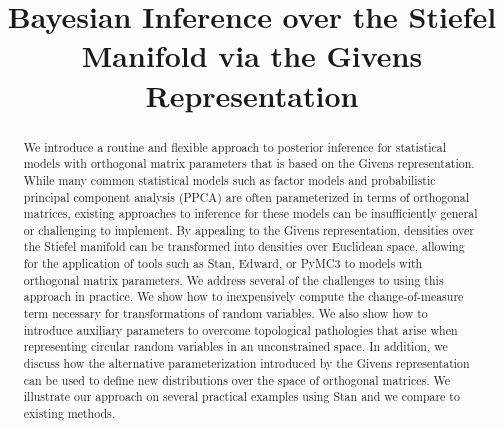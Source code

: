 \documentclass[ba]{imsart}
\numberwithin{equation}{section}
\theoremstyle{plain}
\begin{document}
\begin{frontmatter}
\title{Bayesian Inference over the Stiefel Manifold via the Givens Representation}


\begin{abstract}
We introduce a routine and flexible approach to posterior inference for statistical models with orthogonal matrix parameters that is based on the Givens representation. While many common statistical models such as factor models and probabilistic principal component analysis (PPCA) are often parameterized in terms of orthogonal matrices, existing approaches to inference for these models can be insufficiently general or challenging to implement. By appealing to the Givens representation, densities over the Stiefel manifold can be transformed into densities over Euclidean space, allowing for the application of tools such as Stan, Edward, or PyMC3 to models with orthogonal matrix parameters. We address several of the challenges to using this approach in practice. We show how to inexpensively compute the change-of-measure term necessary for transformations of random variables. We also show how to introduce auxiliary parameters to overcome topological pathologies that arise when representing circular random variables in an unconstrained space. In addition, we discuss how the alternative parameterization introduced by the Givens representation can be used to define new distributions over the space of orthogonal matrices. We illustrate our approach on several practical examples using Stan and we compare to existing methods.
\end{abstract}

\begin{keyword}[class=MSC]
\end{keyword}

\begin{keyword}
\kwd{\LaTeXe}
\end{keyword}

\end{frontmatter}
\end{document}
